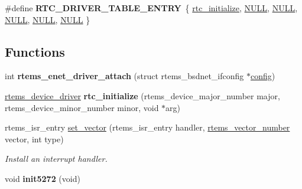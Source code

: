 \begin{DoxyCompactItemize}
\mbox{\label{group__RTEMSBSPsM68kCSB3602_gaf6b3ea67cf553292aba914e0bd0647c2}} 
\#define {\bfseries R\+T\+C\+\_\+\+D\+R\+I\+V\+E\+R\+\_\+\+T\+A\+B\+L\+E\+\_\+\+E\+N\+T\+RY}~\{ \mbox{\hyperlink{group__rtems__rtc_ga2ae314f2070b5f983cab0a77c5ee0126}{rtc\+\_\+initialize}}, \mbox{\hyperlink{bestcomm__api_8h_a872bb74de61c3689ccd5b41873fce42c}{N\+U\+LL}}, \mbox{\hyperlink{bestcomm__api_8h_a872bb74de61c3689ccd5b41873fce42c}{N\+U\+LL}}, \mbox{\hyperlink{bestcomm__api_8h_a872bb74de61c3689ccd5b41873fce42c}{N\+U\+LL}}, \mbox{\hyperlink{bestcomm__api_8h_a872bb74de61c3689ccd5b41873fce42c}{N\+U\+LL}}, \mbox{\hyperlink{bestcomm__api_8h_a872bb74de61c3689ccd5b41873fce42c}{N\+U\+LL}} \}
\end{DoxyCompactItemize}
\subsection*{Functions}
\begin{DoxyCompactItemize}
\item 
\mbox{\label{group__RTEMSBSPsM68kCSB3602_gae9d351ca73457624dddc0bbd3b6b8f81}} 
int {\bfseries rtems\+\_\+enet\+\_\+driver\+\_\+attach} (struct rtems\+\_\+bsdnet\+\_\+ifconfig $\ast$\mbox{\hyperlink{structconfig__s}{config}})
\item 
\mbox{\label{group__RTEMSBSPsM68kCSB3602_ga7b62fc1998de335b8c70c626334e73b3}} 
\mbox{\hyperlink{group__ClassicStatus_ga545d41846817eaba6143d52ee4d9e9fe}{rtems\+\_\+device\+\_\+driver}} {\bfseries rtc\+\_\+initialize} (rtems\+\_\+device\+\_\+major\+\_\+number major, rtems\+\_\+device\+\_\+minor\+\_\+number minor, void $\ast$arg)
\item 
rtems\+\_\+isr\+\_\+entry \mbox{\hyperlink{group__RTEMSBSPsM68kCSB3602_gab3388042c56b34c40be81fd5f028d97e}{set\+\_\+vector}} (rtems\+\_\+isr\+\_\+entry handler, \mbox{\hyperlink{group__ClassicINTR_ga3e434c197d99f128e78cae4d9358bd8b}{rtems\+\_\+vector\+\_\+number}} vector, int type)
\begin{DoxyCompactList}\small\item\em Install an interrupt handler. \end{DoxyCompactList}\item 
\mbox{\label{group__RTEMSBSPsM68kCSB3602_ga4c14350281463e899f449caa5db365f3}} 
void {\bfseries init5272} (void)
\end{DoxyCompactItemize}
